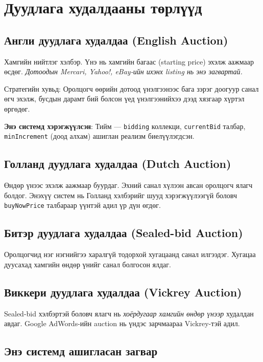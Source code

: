 \documentclass[12pt, a4paper]{report}
\begin{document}
\section{Дуудлага худалдааны төрлүүд}

\subsection{Англи дуудлага худалдаа (English Auction)}

Хамгийн нийтлэг хэлбэр. Үнэ нь хамгийн багаас (starting price) эхэлж аажмаар өсдөг. \textit{Дотоодын Mercari, Yahoo!, eBay-ийн ихэнх listing нь энэ загвартай.}

Стратегийн хувьд: Оролцогч өөрийн дотоод үнэлгээнээс бага зэрэг доогуур санал өгч эхэлж, бусдын дарамт бий болсон үед үнэлгээнийхээ дээд хязгаар хүртэл өргөдөг.

\textbf{Энэ системд хэрэгжүүлсэн}: Тийм — \texttt{bidding} коллекци, \texttt{currentBid} талбар, \texttt{minIncrement} (доод алхам) ашиглан реализм биелүүлэгдсэн.

\subsection{Голланд дуудлага худалдаа (Dutch Auction)}

Өндөр үнээс эхэлж аажмаар буурдаг. Эхний санал хүлээн авсан оролцогч ялагч болдог. Энэхүү систем нь Голланд хэлбэрийг шууд хэрэгжүүлээгүй боловч \texttt{buyNowPrice} талбараар үүнтэй адил үр дүн өгдөг.

\subsection{Битэр дуудлага худалдаа (Sealed-bid Auction)}

Оролцогчид нэг нэгнийгээ харалгүй тодорхой хугацаанд санал илгээдэг. Хугацаа дуусахад хамгийн өндөр үнийг санал болгосон ялдаг.

\subsection{Виккери дуудлага худалдаа (Vickrey Auction)}

Sealed-bid хэлбэртэй боловч ялагч нь \textit{хоёрдугаар хамгийн өндөр үнээр} худалдан авдаг. Google AdWords-ийн auction нь үндэс зарчмаараа Vickrey-тэй адил.

\subsection{Энэ системд ашигласан загвар}
\end{document}
